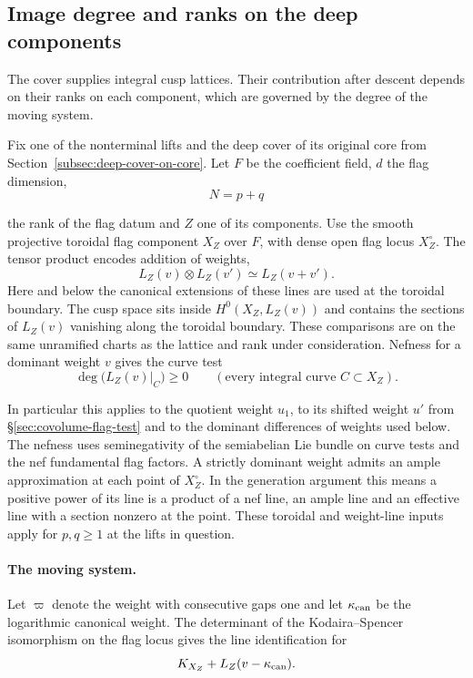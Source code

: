 \subsection{Image degree and ranks on the deep components}
\label{subsec:component-rank-comparison}

The cover supplies integral cusp lattices. Their contribution after descent depends on their ranks on each component, which are governed by the degree of the moving system.

Fix one of the nonterminal lifts and the deep cover of its
original core from Section~\ref{subsec:deep-cover-on-core}. Let
\(F\) be the coefficient field, \(d\) the flag dimension,
\[
 N=p+q
\]

the rank of the flag datum and \(Z\) one of its components.
Use the smooth projective toroidal flag component \(X_Z\) over
\(F\), with dense open flag locus \(X_Z^\circ\). The tensor product encodes addition of weights,
\[
 L_Z(v)\otimes L_Z(v')\simeq L_Z(v+v').
\]
Here and below the
canonical extensions of these lines are used at the toroidal
boundary. The cusp space sits inside \(H^0(X_Z,L_Z(v))\)
and contains the sections of \(L_Z(v)\) vanishing along the
toroidal boundary. These comparisons are on the same
unramified charts as the lattice and rank under consideration.
Nefness for a dominant weight \(v\) gives the curve test 
\[
 \deg\bigl(L_Z(v)|_C\bigr)\ge0\qquad(\text{every integral curve }C\subset X_Z).
\]

In particular this
applies to the quotient weight \(u_1\), to its shifted weight
\(u'\) from \S\ref{sec:covolume-flag-test} and to the dominant
differences of weights used below. The nefness uses
seminegativity of the semiabelian Lie bundle on curve tests
and the nef fundamental flag factors. A strictly dominant
weight admits an ample approximation at each point of
\(X_Z^\circ\). In the generation argument this means a
positive power of its line is a product of a nef line, an
ample line and an effective line with a section nonzero
at the point. These toroidal and weight-line inputs apply
for \(p,q\ge1\) at the lifts in question.
\label{cor:covolume-component-ranks-1}

\paragraph{The moving system.}
Let \(\varpi\) denote the weight with consecutive gaps one
and let \(\kappa_{\rm can}\) be the logarithmic canonical
weight. The determinant of the Kodaira--Spencer isomorphism
on the flag locus gives the line identification for
\[
 K_{X_Z}+L_Z(v-\kappa_{\rm can}).
\]

